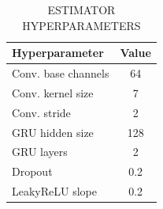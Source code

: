 \begin{table}[H]
	\caption{ESTIMATOR HYPERPARAMETERS}
	\label{tab:estimator_hparams}
	\begin{center}
		\footnotesize
		\begin{tabular}{lc}
			\hline
			\textbf{Hyperparameter} & \textbf{Value} \\
			\hline
			Conv. base channels     & 64             \\
			Conv. kernel size       & 7              \\
			Conv. stride            & 2              \\
			GRU hidden size         & 128            \\
			GRU layers              & 2              \\
			Dropout                 & 0.2            \\
			LeakyReLU slope         & 0.2            \\
			\hline
		\end{tabular}
	\end{center}
\end{table}
